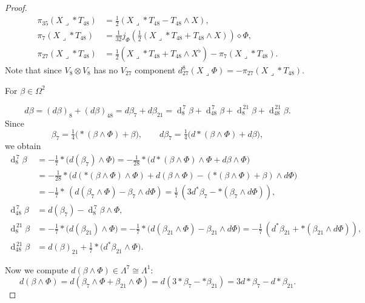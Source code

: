 \documentclass[10pt,a4paper,reqno]{article}
\theoremstyle{definition}
\numberwithin{equation}{section}
\DeclareMathOperator{\dd}{d}
\begin{document}
\begin{proof}
\begin{align*}
\pi_{35}(X\lrcorner *T_{48}) &=\frac12\left(X\lrcorner *T_{48}-T_{48}\wedge X\right),\\
\pi_7(X\lrcorner *T_{48})&=
\frac1{32}j_\Phi\left(\frac12\left(X\lrcorner *T_{48}+T_{48}\wedge X\right)
\right) \diamond \Phi,\\
\pi_{27}(X\lrcorner *T_{48})&=
\frac12\left(X\lrcorner *T_{48}+T_{48}\wedge X^\flat\right)-\pi_7(X\lrcorner *T_{48}).
\end{align*}
Note that since $V_8\otimes V_8$ has no $V_{27}$ component $d^8_{27}(X\lrcorner\Phi)=-\pi_{27}(X\lrcorner *T_{48})$. 




\medskip

For $\beta \in \Omega^2$


\[
d\beta = (d\beta)_8 + (d\beta)_{48}
        = d\beta_7 + d\beta_{21}
        = \dd_8^{\,7}\beta + \dd_{48}^{\,7}\beta
        + \dd_8^{\,21}\beta + \dd_{48}^{\,21}\beta .
\]
Since 
\[
\beta_7 = \tfrac14\big(*(\beta\wedge\Phi)+\beta\big),\qquad
d\beta_7 = \tfrac14\big(d*(\beta\wedge\Phi)+d\beta\big),
\]
we obtain
\begin{align*}
\dd_8^{\,7}\beta
   &= -\tfrac17 *\!\big(d(\beta_7)\wedge\Phi\big)
    = -\tfrac{1}{28}*\!\big(d*(\beta\wedge\Phi)\wedge\Phi + d\beta\wedge\Phi\big)\\
   &= -\tfrac{1}{28}*\!\big(d(*(\beta\wedge\Phi)\wedge\Phi) + d(\beta\wedge\Phi)-(*(\beta\wedge\Phi)+\beta)\wedge d \Phi\big)\\
   &= -\tfrac17 *\,(d(\beta_7\wedge\Phi)-\beta_7\wedge d\Phi) = \tfrac17\,(3 d^*\beta_7-*(\beta_7\wedge d\Phi)),\\[4pt]
\dd_{48}^{\,7}\beta
   &= d(\beta_7) - \dd_8^{\, 7}\beta\wedge\Phi,\\[4pt]
\dd_8^{\,21}\beta
   &= -\tfrac17 *\!\big(d(\beta_{21})\wedge\Phi\big)
    = -\tfrac17 *\!\big(d(\beta_{21}\wedge\Phi)-\beta_{21}\wedge d\Phi\big)
    = -\tfrac17\,(d^*\beta_{21}+*(\beta_{21}\wedge d\Phi)),\\[4pt]
\dd_{48}^{\,21}\beta
   &= d(\beta)_{21} + \tfrac17 *\!\big(d^*\beta_{21}\wedge\Phi\big).
\end{align*}

Now we compute
$d(\beta\wedge\Phi)\in\Lambda^7\cong\Lambda^1$:
\[
d(\beta\wedge\Phi)
 = d(\beta_7\wedge\Phi + \beta_{21}\wedge\Phi)
 = d(3*\beta_7 - *\beta_{21})
 = 3 d*\beta_7 - d*\beta_{21}.
\]


\end{proof}
\end{document}

